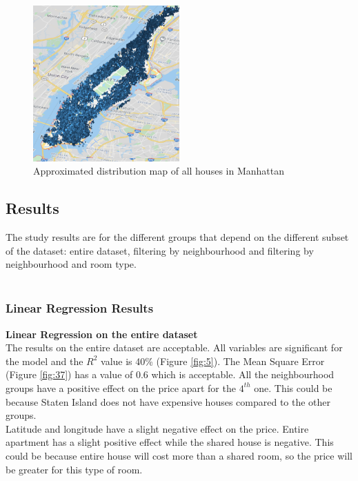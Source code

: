 \documentclass{FR16}
\begin{document}
\begin{figure}[H]
\centering
\includegraphics[width=0.5\textwidth]{figures/figure4.PNG} 
\caption{\label{fig:4}  Approximated distribution map of all houses in Manhattan }
\end{figure}






\newpage


\subsection{Results}

The study results are for the different groups that depend on the different subset of the dataset: entire dataset,  filtering by neighbourhood  and filtering by neighbourhood  and room type. \\\\


\subsubsection{Linear Regression Results}

\textbf{Linear Regression on the entire dataset}\\
\noindent The results on the entire dataset are acceptable. All variables are significant for the model and the $R^2$ value is 40\% (Figure \ref{fig:5}).
The Mean Square Error (Figure \ref{fig:37}) has a value of 0.6 which is acceptable. All the neighbourhood groups have a positive effect on the price apart for the $4^{th}$ one. This could be because Staten Island does not have expensive houses compared to the other groups. \\
Latitude and longitude have a slight negative effect on the price. Entire apartment has a slight positive effect while the shared house is negative. This could be because entire house will cost more than a shared room, so the price will be greater for this type of room. 
\end{document}
